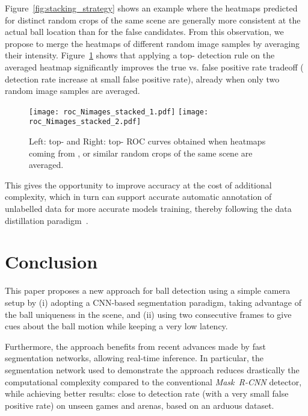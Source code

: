 \documentclass[sigconf, screen]{acmart}
\begin{document}
Figure~\ref{fig:stacking_strategy} shows an example where the heatmaps predicted for distinct random crops of the same scene are generally more consistent at the actual ball location than for the false candidates.
From this observation, we propose to merge the heatmaps of different random image samples by averaging their intensity. Figure~\ref{fig:roc_multiple_images} shows that applying a top- detection rule on the averaged heatmap significantly improves the true vs. false positive rate tradeoff ( detection rate increase at small false positive rate), already when only two random image samples are averaged.






\begin{figure}
    \begin{center}
    \texttt{[image: roc\_Nimages\_stacked\_1.pdf]}\hspace{2em}
    \texttt{[image: roc\_Nimages\_stacked\_2.pdf]}
    \caption{Left: top- and Right: top- ROC curves obtained when heatmaps coming from ,  or  similar random crops of the same scene are averaged.}
    \label{fig:roc_multiple_images}
    \end{center}
\end{figure}


This gives the opportunity to improve accuracy at the cost of additional complexity, which in turn can support accurate automatic annotation of unlabelled data for more accurate models training, thereby following the data distillation paradigm~\cite{Radosavovic2018}.



\section{Conclusion}
\label{sec:conclusion}

This paper proposes a new approach for ball detection using a simple camera setup by (i) adopting a CNN-based segmentation paradigm, taking advantage of the ball uniqueness in the scene, and (ii) using two consecutive frames to give cues about the ball motion while keeping a very low latency.

Furthermore, the approach benefits from recent advances made by fast segmentation networks, allowing real-time inference.
In particular, the segmentation network used to demonstrate the approach reduces drastically the computational complexity compared to the conventional \emph{Mask~R-CNN} detector, while achieving better results: close to  detection rate (with a very small false positive rate) on unseen games and arenas, based on an arduous dataset.
\end{document}
